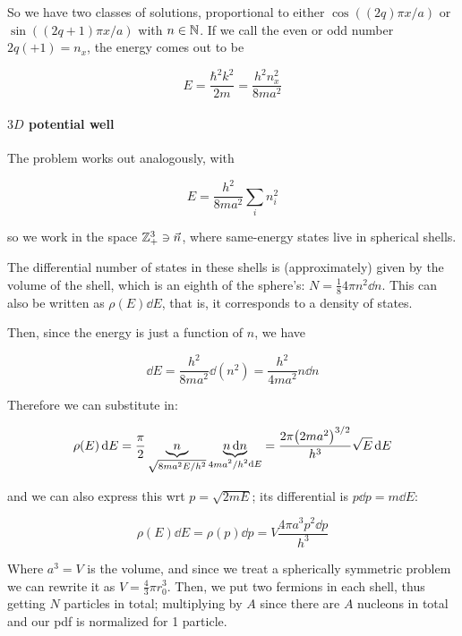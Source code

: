 \documentclass[main.tex]{subfiles}
\begin{document}
So we have two classes of solutions, proportional to either \(\cos((2q)\pi x/a)\) or \(\sin((2q+1)\pi x/a)\) with \(n
\in \mathbb{N}\). If we call the even or odd number \(2q (+1) = n_x\), the energy comes out to be

\begin{equation}
    E = \frac{\hbar^2 k^2}{2m} = \frac{h^2 n_x^2}{8ma^2}
\end{equation}

\paragraph{\(3D\) potential well}

The problem works out analogously, with

\begin{equation}
    E = \frac{h^2}{8ma^2} \sum _i  n_i^2
\end{equation}

so we work in the space \(\mathbb{Z}_+^3 \ni \vec{n} \), where same-energy states live in spherical shells.

The differential number of states in these shells is (approximately) given by the volume of the shell, which is an eighth of the sphere's: \(N = \frac{1}{8} 4 \pi n^2 \dd{n} \). This can also be written as \(\rho(E) \dd{E} \), that is, it corresponds to a density of states.

Then, since the energy is just a function of \(n\), we have

\begin{equation}
    \dd{E} = \frac{h^2}{8ma^2} \dd{(n^2)} =   \frac{h^2}{4ma^2} n\dd{n}
\end{equation}

Therefore we can substitute in:

\begin{equation}
    \rho(E) \dd{E} = \frac{\pi}{2} \underbrace{n}_{\substack{\sqrt{8ma^2 E/h^2}}} \underbrace{n \dd{n} }_{\substack{4ma^2 / h^2} \dd{E} } = \frac{2 \pi  \qty(2ma^2)^{3/2}}{h^3} \sqrt{E} \dd{E}
\end{equation}

and we can also express this wrt \(p = \sqrt{2mE} \); its differential is \(p\dd{p} = m \dd{E} \):

\begin{equation}
    \rho(E) \dd{E} = \rho(p) \dd{p} = V \frac{4 \pi a^3 p^2 \dd{p} }{h^3}
\end{equation}

Where \(a^3 = V\) is the volume, and since we treat a spherically symmetric problem we can rewrite it as \(V = \frac{4}{3}\pi r_0^3\). Then, we put two fermions in each shell, thus getting \(N\) particles in total; multiplying by \(A\) since there are \(A\) nucleons in total and our pdf is normalized for 1 particle.
\end{document}

